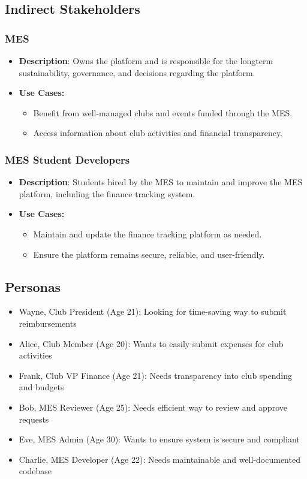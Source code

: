 \documentclass[12pt]{article}
\begin{document}
  \subsection{Indirect Stakeholders}
    \subsubsection{MES}
      \begin{itemize}
        \item \textbf{Description}: Owns the platform and is responsible for the longterm sustainability, governance, and decisions regarding the platform.
        \item \textbf{Use Cases:}
          \begin{itemize}
            \item Benefit from well-managed clubs and events funded through the MES.
            \item Access information about club activities and financial transparency.
          \end{itemize}
      \end{itemize}
    \subsubsection{MES Student Developers}
      \begin{itemize}
        \item \textbf{Description}: Students hired by the MES to maintain and improve the MES platform, including the finance tracking system.
        \item \textbf{Use Cases:}
          \begin{itemize}
            \item Maintain and update the finance tracking platform as needed.
            \item Ensure the platform remains secure, reliable, and user-friendly.
          \end{itemize}
      \end{itemize}

  \subsection{Personas}
    \begin{itemize}
      \item Wayne, Club President (Age 21): Looking for time-saving way to submit reimbursements
      \item Alice, Club Member (Age 20): Wants to easily submit expenses for club activities
      \item Frank, Club VP Finance (Age 21): Needs transparency into club spending and budgets
      \item Bob, MES Reviewer (Age 25): Needs efficient way to review and approve requests
      \item Eve, MES Admin (Age 30): Wants to ensure system is secure and compliant
      \item Charlie, MES Developer (Age 22): Needs maintainable and well-documented codebase
    \end{itemize}
\end{document}
